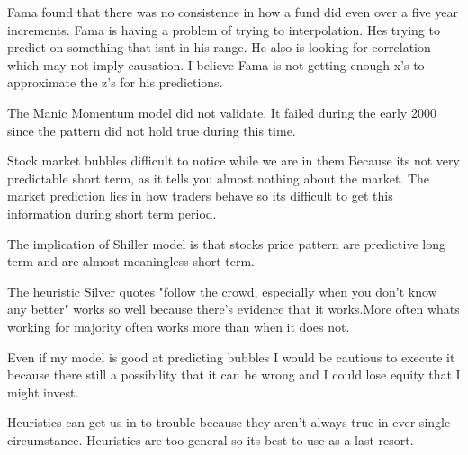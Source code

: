 \documentclass[12pt]{article}
\begin{document}
\begin{enumerate}

Fama found that there was no consistence in how a fund did even over a five year increments. Fama is having a problem of trying to interpolation. Hes trying to predict on something that isnt in his range. He also is looking for correlation which may not imply causation. I believe Fama is not getting enough x's to approximate the z's for his predictions.   


The Manic Momentum model did not validate. It failed during the early 2000  since the pattern did not hold true during this time. 


Stock market bubbles difficult to notice while we are in them.Because its not very predictable short term, as it tells you almost nothing about the market. The market prediction lies in how traders behave so its difficult to get this information during short term period. 


The implication of Shiller model is that stocks price pattern are predictive long term and are almost meaningless short term. 


The heuristic Silver quotes "follow the crowd, especially when you don't know any better" works so well because there's evidence that it works.More often whats working for majority often works more than when it does not.   


Even if my model is good at predicting bubbles I would be cautious to execute it because there still a possibility that it can be wrong and I could lose equity that I might invest. 


Heuristics can get us in to trouble because they aren't always true in ever single circumstance. Heuristics are too general so its best to use as a last resort. 

\end{enumerate}
\end{document}
